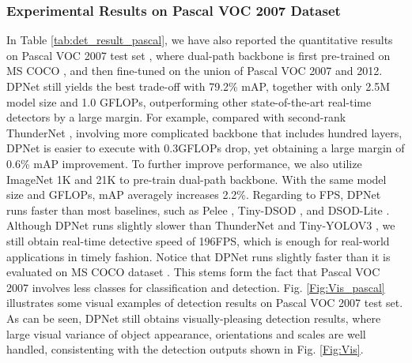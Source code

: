 \documentclass[lettersize,journal]{IEEEtran}
\begin{document}
\subsubsection{Experimental Results on Pascal VOC 2007 Dataset}
In Table \ref{tab:det_result_pascal}, we have also reported the quantitative results on Pascal VOC 2007 test set \cite{everingham2010pascal}, where dual-path backbone is first pre-trained on MS COCO \cite{lin2014microsoft}, and then fine-tuned on the union of Pascal VOC 2007 and 2012. DPNet still yields the best trade-off with 79.2\% mAP, together with only 2.5M model size and 1.0 GFLOPs, outperforming other state-of-the-art real-time detectors by a large margin. For example, compared with second-rank ThunderNet \cite{qin2019thundernet}, involving more complicated backbone that includes hundred layers, DPNet is easier to execute with 0.3GFLOPs drop, yet obtaining a large margin of 0.6\% mAP improvement. To further improve performance, we also utilize ImageNet 1K and 21K \cite{deng2009imagenet} to pre-train dual-path backbone. With the same model size and GFLOPs, mAP averagely increases 2.2\%. Regarding to FPS, DPNet runs faster than most baselines, such as Pelee \cite{Pelee}, Tiny-DSOD \cite{li2018tiny}, and DSOD-Lite \cite{shen2019object}. Although DPNet runs slightly slower than ThunderNet \cite{qin2019thundernet} and Tiny-YOLOV3 \cite{redmon2018yolov3}, we still obtain real-time detective speed of 196FPS, which is enough for real-world applications in timely fashion. Notice that DPNet runs slightly faster than it is evaluated on MS COCO dataset \cite{lin2014microsoft}. This stems form the fact that Pascal VOC 2007 involves less classes for classification and detection. Fig. \ref{Fig:Vis_pascal} illustrates some visual examples of detection results on Pascal VOC 2007 test set. As can be seen, DPNet still obtains visually-pleasing detection results, where large visual variance of object appearance, orientations and scales are well handled, consistenting with the detection outputs shown in Fig. \ref{Fig:Vis}.
\end{document}
